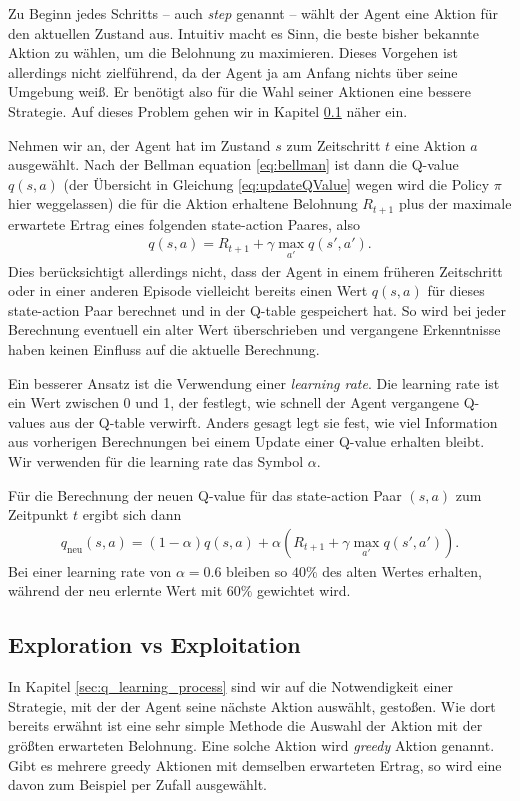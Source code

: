 Zu Beginn jedes Schritts -- auch \textit{step} genannt -- wählt der Agent eine Aktion für den aktuellen Zustand aus. Intuitiv macht es Sinn, die beste bisher bekannte Aktion zu wählen, um die Belohnung zu maximieren. Dieses Vorgehen ist allerdings nicht zielführend, da der Agent ja am Anfang nichts über seine Umgebung weiß. Er benötigt also für die Wahl seiner Aktionen eine bessere Strategie. Auf dieses Problem gehen wir in Kapitel \ref{sec:exploration_exploitation} näher ein.

Nehmen wir an, der Agent hat im Zustand $ s $ zum Zeitschritt $ t $ eine Aktion $ a $ ausgewählt. Nach der Bellman equation \ref{eq:bellman} ist dann die Q-value $ q(s, a) $ (der Übersicht in Gleichung \ref{eq:updateQValue} wegen wird die Policy $ \pi $ hier weggelassen) die für die Aktion erhaltene Belohnung $ R_{t + 1} $ plus der maximale erwartete Ertrag eines folgenden state-action Paares, also
\begin{align}
    q(s, a) = R_{t + 1} + \gamma \max_{a'} q(s', a'). \label{eq:bellmanClean}
\end{align}
Dies berücksichtigt allerdings nicht, dass der Agent in einem früheren Zeitschritt oder in einer anderen Episode vielleicht bereits einen Wert $ q(s, a) $ für dieses state-action Paar berechnet und in der Q-table gespeichert hat. So wird bei jeder Berechnung eventuell ein alter Wert überschrieben und vergangene Erkenntnisse haben keinen Einfluss auf die aktuelle Berechnung.

Ein besserer Ansatz ist die Verwendung einer \textit{learning rate}. Die learning rate ist ein Wert zwischen 0 und 1, der festlegt, wie schnell der Agent vergangene Q-values aus der Q-table verwirft. Anders gesagt legt sie fest, wie viel Information aus vorherigen Berechnungen bei einem Update einer Q-value erhalten bleibt. Wir verwenden für die learning rate das Symbol $ \alpha $.

Für die Berechnung der neuen Q-value für das state-action Paar $ (s, a) $ zum Zeitpunkt $ t $ ergibt sich dann
\begin{align}
    q_\text{neu}(s, a) = (1 - \alpha) q(s, a) + \alpha \left(R_{t + 1} + \gamma \max_{a'} q(s', a') \right). \label{eq:updateQValue}
\end{align}
Bei einer learning rate von $ \alpha = 0.6 $ bleiben so $ 40\% $ des alten Wertes erhalten, während der neu erlernte Wert mit $ 60\% $ gewichtet wird.

\subsection{Exploration vs Exploitation} \label{sec:exploration_exploitation}
In Kapitel \ref{sec:q_learning_process} sind wir auf die Notwendigkeit einer Strategie, mit der der Agent seine nächste Aktion auswählt, gestoßen. Wie dort bereits erwähnt ist eine sehr simple Methode die Auswahl der Aktion mit der größten erwarteten Belohnung. Eine solche Aktion wird \textit{greedy} Aktion genannt. Gibt es mehrere greedy Aktionen mit demselben erwarteten Ertrag, so wird eine davon zum Beispiel per Zufall ausgewählt.

